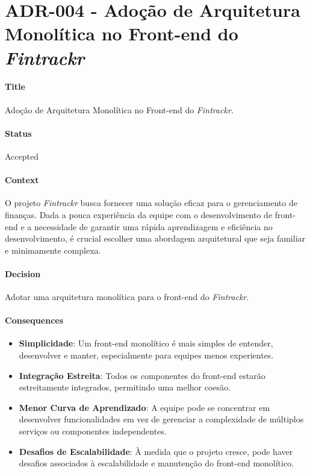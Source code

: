 
\chapter{ADR-004 - Adoção de Arquitetura Monolítica no Front-end do \textit{Fintrackr}}
\label{apendiceADR004}

\subsubsection*{Title}
Adoção de Arquitetura Monolítica no Front-end do \textit{Fintrackr}.

\subsubsection*{Status}
Accepted

\subsubsection*{Context}
O projeto \textit{Fintrackr} busca fornecer uma solução eficaz para o gerenciamento de finanças. Dada a pouca experiência da equipe com o desenvolvimento de front-end e a necessidade de garantir uma rápida aprendizagem e eficiência no desenvolvimento, é crucial escolher uma abordagem arquitetural que seja familiar e minimamente complexa.

\subsubsection*{Decision}
Adotar uma arquitetura monolítica para o front-end do \textit{Fintrackr}.

\subsubsection*{Consequences}
\begin{itemize}
	\item \textbf{Simplicidade}: Um front-end monolítico é mais simples de entender, desenvolver e manter, especialmente para equipes menos experientes.
	\item \textbf{Integração Estreita}: Todos os componentes do front-end estarão estreitamente integrados, permitindo uma melhor coesão.
	\item \textbf{Menor Curva de Aprendizado}: A equipe pode se concentrar em desenvolver funcionalidades em vez de gerenciar a complexidade de múltiplos serviços ou componentes independentes.
	\item \textbf{Desafios de Escalabilidade}: À medida que o projeto cresce, pode haver desafios associados à escalabilidade e manutenção do front-end monolítico.
\end{itemize}

\newpage
